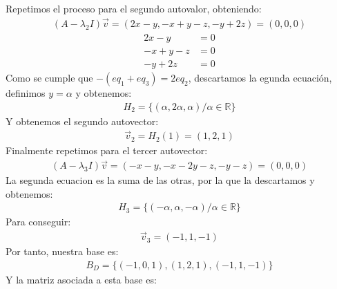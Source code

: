 \documentclass{article}
\begin{document}
\begin{enumerate}[label={(\alph*)}]
Repetimos el proceso para el segundo autovalor, obteniendo:
\begin{equation}
	\begin{split}
		(A-\lambda_2 I)\vec{v}=(2x-y,-x+y-z,-y+2z)=(0,0,0)
	\end{split}
\end{equation}
\begin{equation}
	\begin{split}
		2x-y &= 0\\ -x+y-z &= 0\\ -y+2z &= 0
	\end{split}
\end{equation}
Como se cumple que \(-(eq_1 +eq_3)=2 eq_2\), descartamos la egunda ecuación, definimos \(y=\alpha\)
y obtenemos:
\begin{equation}
	\begin{split}
		H_2= \{ (\alpha, 2\alpha, \alpha) / \alpha \in \mathbb{R} \}
	\end{split}
\end{equation}
Y obtenemos el segundo autovector:
\begin{equation}
	\begin{split}
		\vec{v}_2=H_2(1)=(1,2,1)
	\end{split}
\end{equation}
Finalmente repetimos para el tercer autovector:
\begin{equation}
	\begin{split}
		(A-\lambda_3 I)\vec{v}=(-x-y,-x-2y-z,-y-z)=(0,0,0)
	\end{split}
\end{equation}
La segunda ecuacion es la suma de las otras, por la que la descartamos y obtenemos:
\begin{equation}
	\begin{split}
		H_3=\{ (-\alpha, \alpha, -\alpha) / \alpha \in \mathbb{R} \}
	\end{split}
\end{equation}
Para conseguir:
\begin{equation}
	\begin{split}
		\vec{v}_3=(-1,1,-1)
	\end{split}
\end{equation}
Por tanto, nuestra base es:
\begin{equation}
	\begin{split}
		B_D= \{ (-1,0,1),(1,2,1),(-1,1,-1) \}
	\end{split}
\end{equation}
Y la matriz asociada a esta base es:

\end{enumerate}
\end{document}
